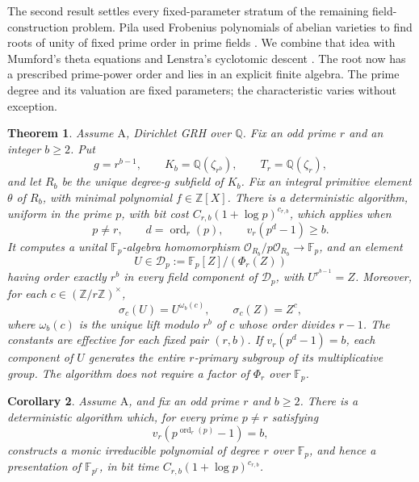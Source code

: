 \documentclass[11pt]{article}
\newtheorem{theorem}{Theorem}[section]
\newtheorem{corollary}[theorem]{Corollary}
\theoremstyle{definition}
\theoremstyle{remark}
\begin{document}
The second result settles every fixed-parameter stratum of the
remaining field-construction problem. Pila used Frobenius polynomials
of abelian varieties to find roots of unity of fixed prime order in
prime fields \citep[Theorem~D, author p.~2; Section~5,
pp.~14--18]{Pila1990}. We combine that idea with Mumford's theta
equations \citep[Section~6, pp.~83--84]{Mumford1967} and
Lenstra's cyclotomic descent \citep[Theorems~(3.1), (5.1),
and (5.2), pp.~334--340]{Lenstra1991}. The root now has a
prescribed prime-power order and lies in an explicit finite algebra.
The prime degree and its valuation are fixed parameters; the
characteristic varies without exception.

\begin{theorem}\label{thm:fixed-wild-cm}
Assume \(\mathrm A\), Dirichlet GRH over \(\mathbb Q\).
Fix an odd prime \(r\) and an integer \(b\geq2\). Put
\[
 g=r^{b-1},\qquad K_b=\mathbb Q(\zeta_{r^b}),\qquad
 T_r=\mathbb Q(\zeta_r),
\]
and let \(R_b\) be the unique degree-\(g\) subfield of \(K_b\).
Fix an integral primitive element \(\theta\) of \(R_b\), with
minimal polynomial \(f\in\mathbb Z[X]\).
There is a deterministic algorithm, uniform in the prime \(p\),
with bit cost \(C_{r,b}(1+\log p)^{c_{r,b}}\), which applies when
\[
 p\ne r,\qquad d=\operatorname{ord}_r(p),\qquad
                         v_r(p^d-1)\geq b.
\]
It computes a unital \(\mathbb F_p\)-algebra homomorphism
\(\mathcal O_{R_b}/p\mathcal O_{R_b}\longrightarrow\mathbb F_p\),
and an element
\[
 U\in\mathcal D_p:=\mathbb F_p[Z]/(\Phi_r(Z))
\]
having order exactly \(r^b\) in every field component of
\(\mathcal D_p\), with \(U^{r^{b-1}}=Z\).
Moreover, for each
\(c\in(\mathbb Z/r\mathbb Z)^\times\),
\begin{equation}
 \sigma_c(U)=U^{\omega_b(c)},\qquad \sigma_c(Z)=Z^c,
 \label{eq:fixed-wild-equivariance}
\end{equation}
where \(\omega_b(c)\) is the unique lift modulo \(r^b\) of
\(c\) whose order divides \(r-1\).
The constants are effective for each fixed pair \((r,b)\).
If \(v_r(p^d-1)=b\), each component of \(U\) generates the
entire \(r\)-primary subgroup of its multiplicative group.
The algorithm does not require a factor of \(\Phi_r\) over
\(\mathbb F_p\).
\end{theorem}

\begin{corollary}\label{cor:fixed-wild-prime-degree-field}
Assume \(\mathrm A\), and fix an odd prime \(r\) and
\(b\geq2\). There is a deterministic algorithm which, for
every prime \(p\ne r\) satisfying
\[
                  v_r(p^{\operatorname{ord}_r(p)}-1)=b,
\]
constructs a monic irreducible polynomial of degree \(r\)
over \(\mathbb F_p\), and hence a presentation of
\(\mathbb F_{p^r}\), in bit time
\(C_{r,b}(1+\log p)^{c_{r,b}}\).
\end{corollary}
\end{document}
